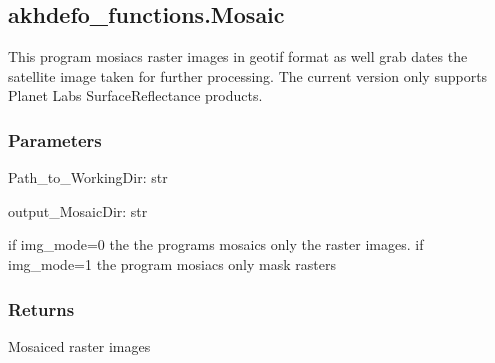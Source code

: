 \documentclass[letterpaper,10pt]{sphinxmanual}
\begin{document}
\sphinxstepscope


\subsection{akhdefo\_functions.Mosaic}
\label{\detokenize{generated/akhdefo_functions.Mosaic:akhdefo-functions-mosaic}}\label{\detokenize{generated/akhdefo_functions.Mosaic::doc}}

\begin{fulllineitems}
\label{\detokenize{generated/akhdefo_functions.Mosaic:akhdefo_functions.Mosaic}}
\pysigstartsignatures
{}
\pysigstopsignatures
\sphinxAtStartPar
This program mosiacs raster images in geotif format as well grab dates the satellite image taken for further processing. 
The current version only supports Planet Labs SurfaceReflectance products.


\subsubsection{Parameters}
\label{\detokenize{generated/akhdefo_functions.Mosaic:parameters}}
\sphinxAtStartPar
Path\_to\_WorkingDir: str

\sphinxAtStartPar
output\_MosaicDir: str
\begin{description}
\sphinxAtStartPar
if img\_mode=0 the the programs mosaics only the raster images. 
if img\_mode=1 the program mosiacs only mask rasters

\end{description}


\subsubsection{Returns}
\label{\detokenize{generated/akhdefo_functions.Mosaic:returns}}
\sphinxAtStartPar
Mosaiced raster images

\end{fulllineitems}


\sphinxstepscope
\end{document}
